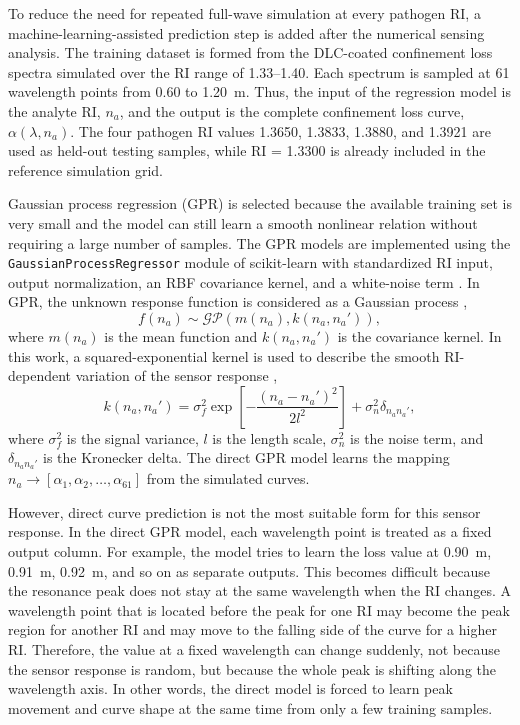 \documentclass[preprint,12pt]{elsarticle}
\begin{document}
To reduce the need for repeated full-wave simulation at every pathogen RI, a machine-learning-assisted prediction step is added after the numerical sensing analysis. The training dataset is formed from the DLC-coated confinement loss spectra simulated over the RI range of 1.33--1.40. Each spectrum is sampled at 61 wavelength points from 0.60 to 1.20~\textmu m. Thus, the input of the regression model is the analyte RI, $n_a$, and the output is the complete confinement loss curve, $\alpha(\lambda,n_a)$. The four pathogen RI values 1.3650, 1.3833, 1.3880, and 1.3921 are used as held-out testing samples, while RI = 1.3300 is already included in the reference simulation grid.

Gaussian process regression (GPR) is selected because the available training set is very small and the model can still learn a smooth nonlinear relation without requiring a large number of samples. The GPR models are implemented using the \texttt{GaussianProcessRegressor} module of scikit-learn with standardized RI input, output normalization, an RBF covariance kernel, and a white-noise term \cite{pedregosa2011scikit}. In GPR, the unknown response function is considered as a Gaussian process \cite{rasmussen2006gaussian},
\begin{equation}
f(n_a)\sim \mathcal{GP}\left(m(n_a),k(n_a,n_a')\right),
\label{eq:gpr_prior}
\end{equation}
where $m(n_a)$ is the mean function and $k(n_a,n_a')$ is the covariance kernel. In this work, a squared-exponential kernel is used to describe the smooth RI-dependent variation of the sensor response \cite{rasmussen2006gaussian},
\begin{equation}
k(n_a,n_a')=\sigma_f^2\exp\left[-\frac{(n_a-n_a')^2}{2l^2}\right]+\sigma_n^2\delta_{n_a n_a'},
\label{eq:gpr_kernel}
\end{equation}
where $\sigma_f^2$ is the signal variance, $l$ is the length scale, $\sigma_n^2$ is the noise term, and $\delta_{n_a n_a'}$ is the Kronecker delta. The direct GPR model learns the mapping $n_a\rightarrow [\alpha_1,\alpha_2,\ldots,\alpha_{61}]$ from the simulated curves.

However, direct curve prediction is not the most suitable form for this sensor response. In the direct GPR model, each wavelength point is treated as a fixed output column. For example, the model tries to learn the loss value at 0.90~\textmu m, 0.91~\textmu m, 0.92~\textmu m, and so on as separate outputs. This becomes difficult because the resonance peak does not stay at the same wavelength when the RI changes. A wavelength point that is located before the peak for one RI may become the peak region for another RI and may move to the falling side of the curve for a higher RI. Therefore, the value at a fixed wavelength can change suddenly, not because the sensor response is random, but because the whole peak is shifting along the wavelength axis. In other words, the direct model is forced to learn peak movement and curve shape at the same time from only a few training samples.
\end{document}
